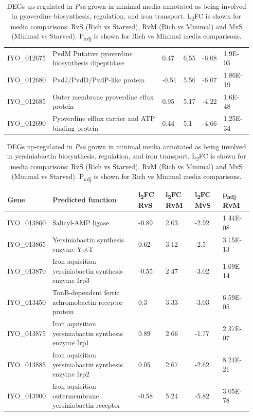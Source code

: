 \begin{table}[H]
\begin{tabular}{p{1.8cm}p{7.5cm}p{0.8cm}p{0.8cm}p{0.8cm}p{1.5cm}}
IYO_012675 & PvdM Putative pyoverdine biosynthesis dipeptidase & 0.47 & 6.55 & -6.08 & 1.9E-05\\
IYO_012680	& PvdJ/PvdD/PvdP-like protein & -0.51 & 5.56 & -6.07 & 1.86E-19\\
IYO_012685 & Outer membrane pyoverdine eflux protein & 0.95 & 5.17 & -4.22 & 1.6E-48\\
IYO_012690 & Pyoverdine efflux carrier and ATP binding protein & 0.44 & 5.1 & -4.66 & 1.25E-34 \\
\bottomrule
    \end{tabular}
    \caption[Siderophore genes up-regulated in \textit{Psa} in minimal media]{DEGs up-regulated in \textit{Psa} grown in minimal media annotated as being involved in pyoverdine biosynthesis, regulation, and iron transport. L\textsubscript{2}FC is shown for media comparisons: RvS (Rich vs Starved), RvM (Rich vs Minimal) and MvS (Minimal vs Starved). P\textsubscript{adj} is shown for Rich vs Minimal media comparisons.}
    \label{tab:min_iron}
\end{table}

\begin{table}[H]
\footnotesize
    \centering
    \begin{tabular}{p{1.8cm}p{7.5cm}p{0.8cm}p{0.8cm}p{0.8cm}p{1.5cm}}\toprule
Gene & Predicted function & l\textsubscript{2}FC RvS  & l\textsubscript{2}FC RvM & l\textsubscript{2}FC MvS & p\textsubscript{adj} RvM\\\midrule
IYO_013860	& Salicyl-AMP ligase & -0.89 &2.03 &-2.92&1.44E-08\\
IYO_013865	& Yersiniabactin synthesis enzyme YbtT & 0.62 & 3.12 & -2.5&3.15E-13\\															
IYO_013870 &Iron aquisition yersiniabactin synthesis enzyme Irp3 & -0.55 & 2.47 & -3.02 & 1.69E-14\\
IYO_013450 & TonB-dependent ferric achromobactin receptor protein & 0.3 & 3.33 & -3.03 & 6.59E-05\\
IYO_013875 & Iron aquisition yersiniabactin synthesis enzyme Irp1 & 0.89 & 2.66 & -1.77 & 2.37E-07\\
IYO_013885&Iron aquisition yersiniabactin synthesis enzyme Irp2 & 0.05 & 2.67 & -2.62 &8.24E-21 \\
IYO_013900	& Iron aquisition outermembrane yersiniabactin receptor & -0.58 & 5.24 & -5.82 & 3.05E-78\\
\bottomrule
    \end{tabular}
    \caption[Yersiniabactin genes up-regulated in \textit{Psa} in minimal media]{DEGs up-regulated in \textit{Psa} grown in minimal media annotated as being involved in yersiniabactin biosynthesis, regulation, and iron transport. L\textsubscript{2}FC is shown for media comparisons: RvS (Rich vs Starved), RvM (Rich vs Minimal) and MvS (Minimal vs Starved). P\textsubscript{adj} is shown for Rich vs Minimal media comparisons.}
    \label{tab:min_iron_2}
\end{table}

